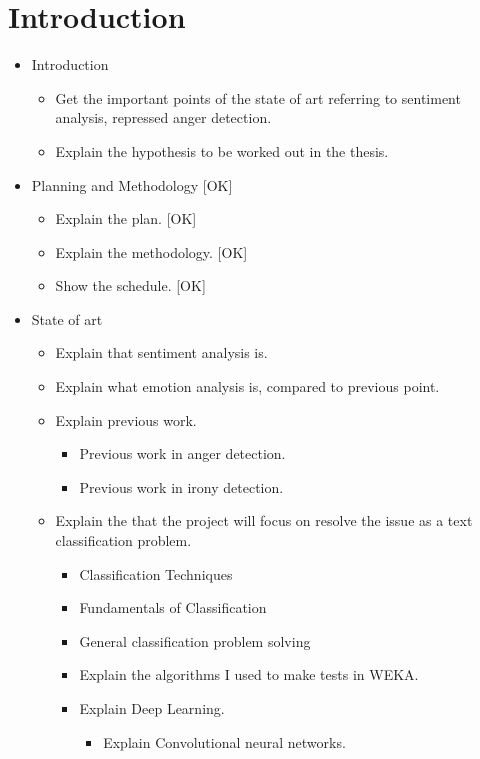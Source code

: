 \chapter{Introduction}
 
\begin{itemize}
  \item Introduction
  \begin{itemize}
    \item Get the important points of the state of art referring to sentiment analysis, repressed anger detection.
    \item Explain the hypothesis to be worked out in the thesis.
  \end{itemize}

  \item Planning and Methodology [OK]
  \begin{itemize}
    \item Explain the plan. [OK]
    \item Explain the methodology. [OK]
    \item Show the schedule. [OK]
  \end{itemize}

  \item State of art
  \begin{itemize}
    \item Explain that sentiment analysis is.
    \item Explain what emotion analysis is, compared to previous point.
    \item Explain previous work.
    \begin{itemize}
      \item Previous work in anger detection.
      \item Previous work in irony detection.
    \end{itemize}
    \item Explain the that the project will focus on resolve the issue as a text classification problem.
    \begin{itemize}
      \item Classification Techniques 
      \item Fundamentals of Classification 
      \item General classification problem solving
      \item Explain the algorithms I used to make tests in WEKA.
      \item Explain Deep Learning.
      \begin{itemize}
        \item Explain Convolutional neural networks.
      \end{itemize}
    \end{itemize}
  \end{itemize} 


\end{itemize}
